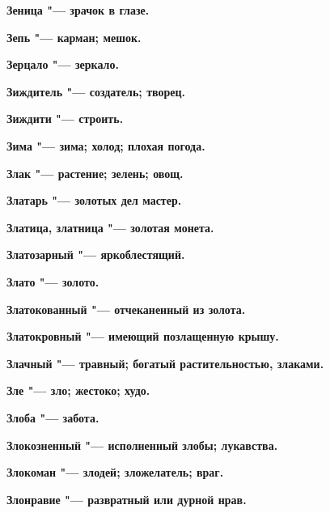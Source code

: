 \bfseries Зеница \normalfont{} "--- зрачок в глазе. 




\bfseries Зепь \normalfont{} "--- карман; мешок. 




\bfseries Зерцало \normalfont{} "--- зеркало. 




\bfseries Зиждитель \normalfont{} "--- создатель; творец. 




\bfseries Зиждити \normalfont{} "--- строить. 




\bfseries Зима \normalfont{} "--- зима; холод; плохая погода. 




\bfseries Злак \normalfont{} "--- растение; зелень; овощ. 




\bfseries Златарь \normalfont{} "--- золотых дел мастер. 




\bfseries Златица, златница \normalfont{} "--- золотая монета. 




\bfseries Златозарный \normalfont{} "--- яркоблестящий. 




\bfseries Злато \normalfont{} "--- золото. 




\bfseries Златокованный \normalfont{} "--- отчеканенный из золота. 




\bfseries Златокровный \normalfont{} "--- имеющий позлащенную крышу. 




\bfseries Злачный \normalfont{} "--- травный; богатый растительностью, злаками. 




\bfseries Зле \normalfont{} "--- зло; жестоко; худо. 




\bfseries Злоба \normalfont{} "--- забота. 




\bfseries Злокозненный \normalfont{} "--- исполненный злобы; лукавства. 




\bfseries Злокоман \normalfont{} "--- злодей; зложелатель; враг. 




\bfseries Злонравие \normalfont{} "--- развратный или дурной нрав. 




